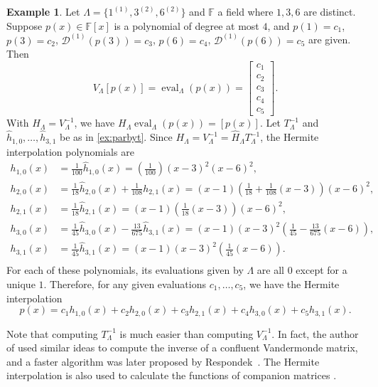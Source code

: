 \documentclass{article}
\theoremstyle{definition}
\newtheorem{example}[theorem]{Example}
\newcommand{\eval}{\operatorname{eval}}
\begin{document}
\begin{example} Let $\Lambda = \{1^{(1)},3^{(2)},6^{(2)}\}$ and $\mathbb{F}$ a field where $1,3,6$ are distinct.
Suppose $p(x)\in {\mathbb F}[x]$ is a polynomial of degree at most $4$,
and $p(1) = c_1$, $p(3) = c_2$, $\mathcal{D}^{(1)}(p(3)) = c_3$, $p(6) = c_4$, $\mathcal{D}^{(1)}(p(6)) = c_5$ are given.  
 Then
\[
    V_\Lambda [p(x)] = \eval_\Lambda(p(x)) = \begin{bmatrix} c_1 \\ c_2 \\ c_3 \\ c_4 \\ c_5 \end{bmatrix}.
\]
With $H_\Lambda = V_\Lambda^{-1}$, we have $H_\Lambda \eval_\Lambda(p(x)) = [p(x)]$.  Let $T_\Lambda^{-1}$ and $\hat{h}_{1,0}, \ldots, \hat{h}_{3,1}$ be as in \cref{ex:parbyt}.  Since $H_\Lambda = V_\Lambda^{-1} = \hat{H}_\Lambda T^{-1}_\Lambda$, the Hermite interpolation polynomials are 
\[
    \begin{aligned}
        h_{1,0}(x) &= \frac{1}{100}\hat{h}_{1,0}(x) = \left(\frac{1}{100}\right)(x - 3)^2(x - 6)^2, \\
        h_{2,0}(x) &= \frac{1}{18}\hat{h}_{2,0}(x) + \frac{1}{108}h_{2,1}(x) = (x - 1)\left(\frac{1}{18} + \frac{1}{108}(x-3)\right)(x - 6)^2, \\
        h_{2,1}(x) &= \frac{1}{18}\hat{h}_{2,1}(x) = (x - 1)\left(\frac{1}{18}(x - 3)\right)(x - 6)^2, \\
        h_{3,0}(x) &= \frac{1}{45}\hat{h}_{3,0}(x) - \frac{13}{675}\hat{h}_{3,1}(x) = (x - 1)(x - 3)^2\left(\frac{1}{45} - \frac{13}{675}(x - 6)\right), \\
        h_{3,1}(x) &= \frac{1}{45}\hat{h}_{3,1}(x) = (x - 1)(x - 3)^2\left(\frac{1}{45}(x - 6)\right). \\
    \end{aligned}
\]
For each of these polynomials, its evaluations given by $\Lambda$ are all $0$ except for a unique $1$.  Therefore, for any given evaluations $c_1, \ldots, c_5$, we have the Hermite interpolation
\[
    p(x) = c_1h_{1,0}(x) + c_2h_{2,0}(x) + c_3h_{2,1}(x) + c_4h_{3,0}(x) + c_5h_{3,1}(x).
\]
\end{example}

Note that computing $T^{-1}_\Lambda$ is much easier than computing $V_\Lambda^{-1}$.  
In fact, the author of \cite{HP02} used similar ideas to compute the inverse of a 
confluent Vandermonde matrix, and a faster algorithm was later proposed by Respondek~\cite{Respondek21}.  The Hermite interpolation is also used to calculate the functions of companion matrices 
\cite{Eller87, MacDuffee50}.
\end{document}
